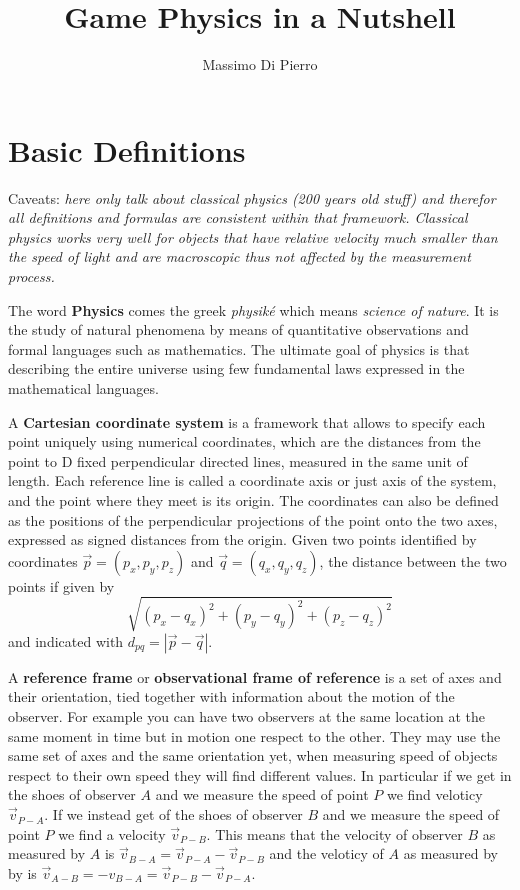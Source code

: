 \documentclass[12pt]{article}
\title{Game Physics in a Nutshell}
\author{Massimo Di Pierro}
\date{}
\begin{document}
\maketitle
\tableofcontents
\newpage

\section{Basic Definitions}

Caveats: {\it here only talk about classical physics (200 years old stuff) and therefor all definitions and formulas are consistent within that framework. Classical physics works very well for objects that have relative velocity much smaller than the speed of light and are macroscopic thus not affected by the measurement process.}

The word {\bf Physics} comes the greek {\it physik\'e} which means
{\it science of nature}. It is the study of natural phenomena by means of
quantitative observations and formal languages such as
mathematics. The ultimate goal of physics is that describing the
entire universe using few fundamental laws expressed in the
mathematical languages.

A {\bf Cartesian coordinate system} is a framework that allows to specify each point uniquely using numerical coordinates, which are the distances from the point to D fixed perpendicular directed lines, measured in the same unit of length. Each reference line is called a coordinate axis or just axis of the system, and the point where they meet is its origin. The coordinates can also be defined as the positions of the perpendicular projections of the point onto the two axes, expressed as signed distances from the origin. Given two points identified by coordinates $\vec p = (p_x,p_y,p_z)$ and $\vec q = (q_x,q_y,q_z)$, the distance between the two points if given by 
\begin{equation}
\sqrt{(p_x-q_x)^2+(p_y-q_y)^2+(p_z-q_z)^2}
\end{equation}
and indicated with $d_{pq} = \left|\vec p - \vec q\right|$.

A {\bf reference frame} or {\bf observational frame of reference} is a set of axes and their orientation, tied together with information about the motion of the observer. For example you can have two observers at the same location at the same moment in time but in motion one respect to the other. They may use the same set of axes and the same orientation yet, when measuring speed of objects respect to their own speed they will find different values. In particular if we get in the shoes of observer $A$ and we measure the speed of point $P$ we find veloticy $\vec v_{P-A}$. If we instead get of the shoes of observer $B$ and we measure the speed of point $P$ we find a velocity $\vec v_{P-B}$. This means that the velocity of observer $B$ as measured by $A$ is $\vec v_{B-A} = \vec v_{P-A}-\vec v_{P-B}$ and the veloticy of $A$ as measured by by is $\vec v_{A-B} = - v_{B-A} = \vec v_{P-B}-\vec v_{P-A}$.
\end{document}
